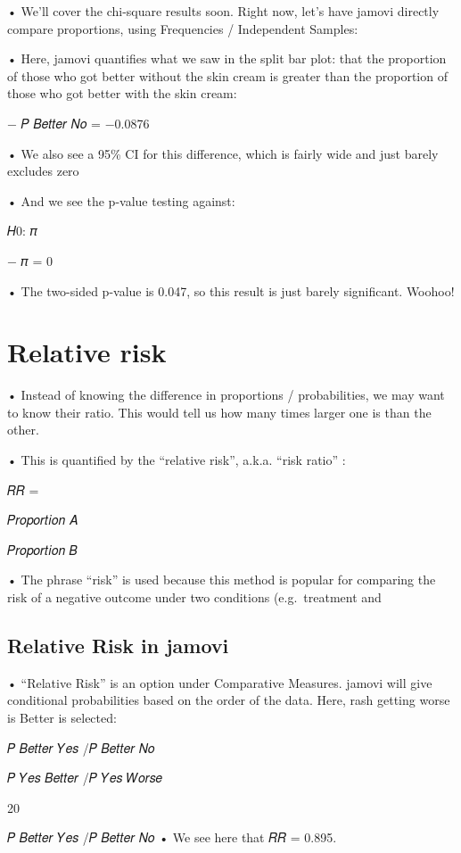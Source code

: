 \documentclass[
  letterpaper,
  DIV=11,
  numbers=noendperiod]{scrreprt}
\begin{document}
• We'll cover the chi-square results soon. Right now, let's have jamovi
directly compare proportions, using Frequencies / Independent Samples:

• Here, jamovi quantifies what we saw in the split bar plot: that the
proportion of those who got better without the skin cream is greater
than the proportion of those who got better with the skin cream:

− 𝑃 𝐵𝑒𝑡𝑡𝑒𝑟 𝑁𝑜 = −0.0876

• We also see a 95\% CI for this difference, which is fairly wide and
just barely excludes zero

• And we see the p-value testing against:

𝐻0: 𝜋

− 𝜋 = 0

• The two-sided p-value is 0.047, so this result is just barely
significant. Woohoo!

\hypertarget{relative-risk}{%
\section{Relative risk}\label{relative-risk}}

• Instead of knowing the difference in proportions / probabilities, we
may want to know their ratio. This would tell us how many times larger
one is than the other.

• This is quantified by the ``relative risk'', a.k.a. ``risk ratio'' :

𝑅𝑅 =

𝑃𝑟𝑜𝑝𝑜𝑟𝑡𝑖𝑜𝑛 𝐴

𝑃𝑟𝑜𝑝𝑜𝑟𝑡𝑖𝑜𝑛 𝐵

• The phrase ``risk'' is used because this method is popular for
comparing the risk of a negative outcome under two conditions
(e.g.~treatment and

\hypertarget{relative-risk-in-jamovi}{%
\subsection{Relative Risk in jamovi}\label{relative-risk-in-jamovi}}

• ``Relative Risk'' is an option under Comparative Measures. jamovi will
give conditional probabilities based on the order of the data. Here,
rash getting worse is Better is selected:

𝑃 𝐵𝑒𝑡𝑡𝑒𝑟 𝑌𝑒𝑠 /𝑃 𝐵𝑒𝑡𝑡𝑒𝑟 𝑁𝑜

𝑃 𝑌𝑒𝑠 𝐵𝑒𝑡𝑡𝑒𝑟 /𝑃 𝑌𝑒𝑠 𝑊𝑜𝑟𝑠𝑒

20

𝑃 𝐵𝑒𝑡𝑡𝑒𝑟 𝑌𝑒𝑠 /𝑃 𝐵𝑒𝑡𝑡𝑒𝑟 𝑁𝑜 • We see here that 𝑅𝑅 = 0.895.
\end{document}
